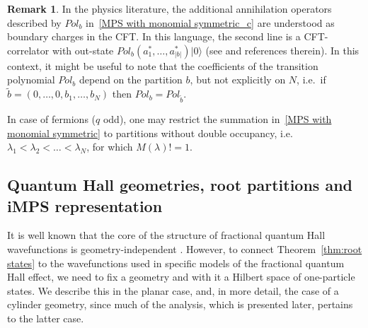 \documentclass[letterpaper, DIV=17]{scrartcl}
\numberwithin{equation}{section}
\theoremstyle{definition}
\newtheorem{rem}[theorem]{Remark}
\newcommand{\pol}{Pol}
\begin{document}
\begin{rem}
In the physics literature, the additional annihilation operators described by  $\pol_{b} $ in~\eqref{MPS with monomial symmetric_c} are understood as boundary charges in the CFT. In this language, the second line is a CFT-correlator with out-state $\pol_{b}(a_1^*, \dots, a_{\vert b \vert}^*) \vert 0\rangle$ (see \cite{estienne2013fractional,schossler2022inner} and references therein). In this context, it might be useful to note that the coefficients of the transition polynomial $\pol_b$ depend on the partition $b$, but not explicitly on $N$, i.e.\ if $\tilde{b}=(0, \dots, 0, b_1, \dots, b_N)$ then $\pol_{b}=\pol_{\tilde{b}}$.


In case of  fermions ($ q $ odd), one may restrict the summation in~\eqref{MPS with monomial symmetric} to partitions without double occupancy, i.e.\ $ \lambda_1 < \lambda_2 < \dots < \lambda_N $, for which $ M(\lambda)! = 1 $. 
\end{rem}
			
			
			

\subsection{Quantum Hall geometries, root partitions and iMPS representation}
%
It is well known that the core of the structure of fractional quantum Hall wavefunctions is geometry-independent \cite{estienne2013fractional,10.1063/1.5046122}.
However, to connect Theorem~\ref{thm:root states} to the wavefunctions used in specific models of the fractional quantum Hall effect, we need to fix a geometry and with it a Hilbert space of one-particle states. 
We describe this in the planar case, and,  in more detail, the case of a cylinder geometry, since much of the analysis, which is presented later, pertains to the latter case.
%
\end{document}
